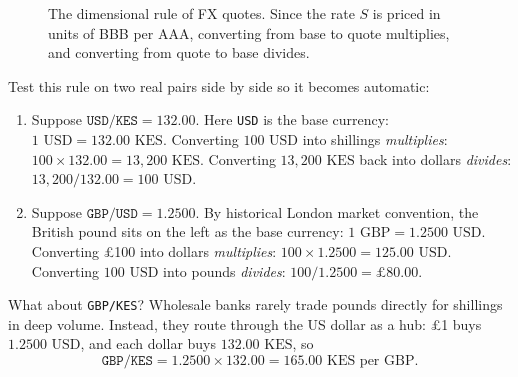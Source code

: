 \begin{figure}[htbp]
\centering
{}
\caption{The dimensional rule of FX quotes. Since the rate $S$ is priced in units of BBB per AAA, converting from base to quote multiplies, and converting from quote to base divides.}
\label{fig:fx-dimension-rule}
\end{figure}


Test this rule on two real pairs side by side so it becomes automatic:
\begin{enumerate}
  \item Suppose $\texttt{USD/KES} = 132.00$. Here \texttt{USD} is the base currency: $1\text{ USD} = 132.00\text{ KES}$. Converting $100\text{ USD}$ into shillings \emph{multiplies}: $100 \times 132.00 = 13{,}200\text{ KES}$. Converting $13{,}200\text{ KES}$ back into dollars \emph{divides}: $13{,}200 / 132.00 = 100\text{ USD}$.
  \item Suppose $\texttt{GBP/USD} = 1.2500$. By historical London market convention, the British pound sits on the left as the base currency: $1\text{ GBP} = 1.2500\text{ USD}$. Converting \pounds 100 into dollars \emph{multiplies}: $100 \times 1.2500 = 125.00\text{ USD}$. Converting $100\text{ USD}$ into pounds \emph{divides}: $100 / 1.2500 = \pounds 80.00$.
\end{enumerate}

What about \texttt{GBP/KES}? Wholesale banks rarely trade pounds directly for shillings in deep volume. Instead, they route through the US dollar as a hub: \pounds 1 buys $1.2500\text{ USD}$, and each dollar buys $132.00\text{ KES}$, so
\[
  \texttt{GBP/KES} = 1.2500 \times 132.00 = 165.00\text{ KES per GBP}.
\]

